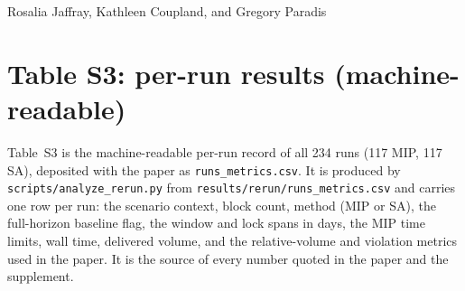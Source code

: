 \documentclass[11pt,letterpaper]{article}
\begin{document}
\vspace{0.5em}
\noindent Rosalia Jaffray, Kathleen Coupland, and Gregory Paradis

\begin{table}[h]
  \centering
  \caption{Calibration of the per-window MIP time limits (Gurobi 13.0.3, one thread, first
  rolling window of each configuration, lock span 7 days). Binaries: binary variables of the stage-1 model before presolve. Stage 1 (delivered-volume objective)
  ran for 7200~s and the earliness stage for 1800~s. Shortfall: relative difference between the
  incumbent objective at the given time and the incumbent at the end of the stage. Gap: relative
  MIP optimality gap reported by the solver. n/a: no incumbent was logged before that time (for
  the 112-day, 40-block window the first non-empty stage-1 incumbent appeared after about
  1350~s). Source: \texttt{results/calibration/}.}
  \label{tab:calibration}
  \small
  
\end{table}

\begin{table}[h]
  \centering
  \caption{First-window volumes with the open-source HiGHS~1.15.1 and with Gurobi~13.0.3 (one
  thread, stage 1 limited to 1800~s, earliness stage to 300~s). Planned: volume delivered by the
  window plan. Locked: volume delivered in the locked first 7 days. A value of 0 means the solver
  returned only the empty plan within the limit. Source: \texttt{results/solver\_probe/}.}
  \label{tab:solverprobe}
  \small
  
\end{table}

\section*{Table S3: per-run results (machine-readable)}

Table~S3 is the machine-readable per-run record of all 234 runs (117 MIP, 117 SA), deposited with
the paper as \texttt{runs\_metrics.csv}. It is produced by \texttt{scripts/analyze\_rerun.py} from
\texttt{results/rerun/runs\_metrics.csv} and carries one row per run: the scenario context, block
count, method (MIP or SA), the full-horizon baseline flag, the window and lock spans in days, the MIP
time limits, wall time, delivered volume, and the relative-volume and violation metrics used in the
paper. It is the source of every number quoted in the paper and the supplement.
\end{document}
